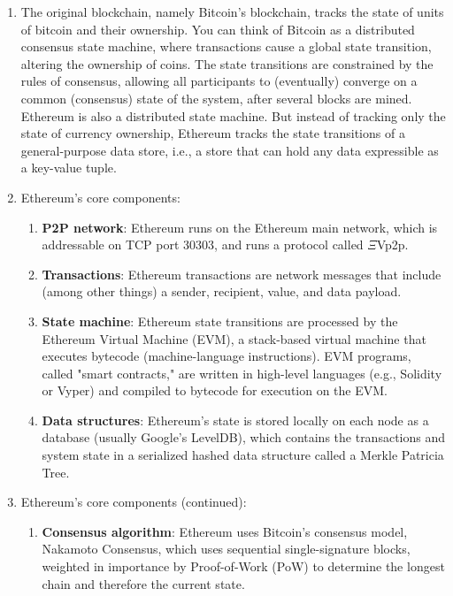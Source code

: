 \begin{enumerate}
\item The original blockchain, namely Bitcoin's blockchain, tracks the state of units of bitcoin and their ownership. You can think of Bitcoin as a distributed consensus state machine, where transactions cause a global state transition, altering the ownership of coins. The state transitions are constrained by the rules of consensus, allowing all participants to (eventually) converge on a common (consensus) state of the system, after several blocks are mined. Ethereum is also a distributed state machine. But instead of tracking only the state of currency ownership, Ethereum tracks the state transitions of a general-purpose data store, i.e., a store that can hold any data expressible as a key-value tuple.

\item Ethereum's core components:
\begin{enumerate}

\item\textbf{P2P network}: Ethereum runs on the Ethereum main network, which is addressable on TCP port 30303, and runs a protocol called \DJ$\Xi$Vp2p.

\item\textbf{Transactions}: Ethereum transactions are network messages that include (among other things) a sender, recipient, value, and data payload.

\item\textbf{State machine}: Ethereum state transitions are processed by the Ethereum Virtual Machine (EVM), a stack-based virtual machine that executes bytecode (machine-language instructions). EVM programs, called "smart contracts," are written in high-level languages (e.g., Solidity or Vyper) and compiled to bytecode for execution on the EVM.

\item\textbf{Data structures}: Ethereum's state is stored locally on each node as a database (usually Google's LevelDB), which contains the transactions and system state in a serialized hashed data structure called a Merkle Patricia Tree.
\end{enumerate}

\item Ethereum's core components (continued):
\begin{enumerate}

\item\textbf{Consensus algorithm}: Ethereum uses Bitcoin's consensus model, Nakamoto Consensus, which uses sequential single-signature blocks, weighted in importance by Proof-of-Work (PoW) to determine the longest chain and therefore the current state.


\end{enumerate}
\end{enumerate}
